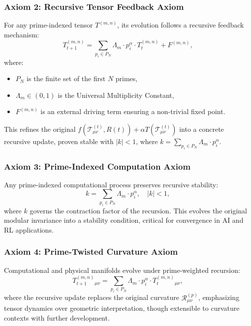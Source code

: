 \documentclass[12pt]{article}
\begin{document}
 \subsubsection{Axiom 2: Recursive Tensor Feedback Axiom}
For any prime-indexed tensor \( T^{(m,n)} \), its evolution follows a recursive feedback mechanism:
\begin{equation}
    T_{t+1}^{(m,n)} = \sum_{p_i \in P_N} \Lambda_m \cdot p_i^\alpha \cdot T_t^{(m,n)} + F^{(m,n)},
\end{equation}
where:
\begin{itemize}
    \item \( P_N \) is the finite set of the first \( N \) primes,
    \item \( \Lambda_m \in (0, 1) \) is the Universal Multiplicity Constant,
    \item \( F^{(m,n)} \) is an external driving term ensuring a non-trivial fixed point.
\end{itemize}
This refines the original \( f(\mathcal{T}_{\mu\nu}^{(t)}, R(t)) + \alpha T(\mathcal{T}_{\mu\nu}^{(t)}) \) into a concrete recursive update, proven stable with \( |k| < 1 \), where \( k = \sum_{p_i \in P_N} \Lambda_m \cdot p_i^\alpha \).

 \subsubsection{Axiom 3: Prime-Indexed Computation Axiom}
Any prime-indexed computational process preserves recursive stability:
\begin{equation}
    k = \sum_{p_i \in P_N} \Lambda_m \cdot p_i^\alpha, \quad |k| < 1,
\end{equation}
where \( k \) governs the contraction factor of the recursion. This evolves the original modular invariance into a stability condition, critical for convergence in AI and RL applications.

 \subsubsection{Axiom 4: Prime-Twisted Curvature Axiom}
Computational and physical manifolds evolve under prime-weighted recursion:
\begin{equation}
    T_{t+1}^{(m,n)}{}_{\mu\nu} = \sum_{p_i \in P_N} \Lambda_m \cdot p_i^\alpha \cdot T_t^{(m,n)}{}_{\mu\nu},
\end{equation}
where the recursive update replaces the original curvature \( \mathcal{R}_{\mu\nu}^{(p)} \), emphasizing tensor dynamics over geometric interpretation, though extensible to curvature contexts with further development.
\end{document}
